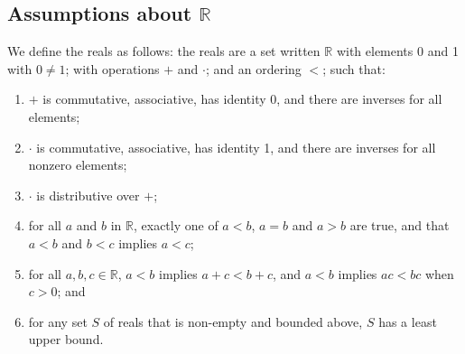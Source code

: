 \subsection{Assumptions about \(\mathbb R\)}
We define the reals as follows: the reals are a set written \(\mathbb R\) with elements 0 and 1 with \(0 \neq 1\); with operations \(+\) and \(\cdot\); and an ordering \(<\); such that:
\begin{enumerate}
	\item \(+\) is commutative, associative, has identity 0, and there are inverses for all elements;
	\item \(\cdot\) is commutative, associative, has identity 1, and there are inverses for all nonzero elements;
	\item \(\cdot\) is distributive over \(+\);
	\item for all \(a\) and \(b\) in \(\mathbb R\), exactly one of \(a<b\), \(a=b\) and \(a>b\) are true, and that \(a<b\) and \(b<c\) implies \(a<c\);
	\item for all \(a, b, c \in \mathbb R\), \(a<b\) implies \(a + c < b + c\), and \(a<b\) implies \(ac < bc\) when \(c > 0\); and
	\item for any set \(S\) of reals that is non-empty and bounded above, \(S\) has a least upper bound.
\end{enumerate}
